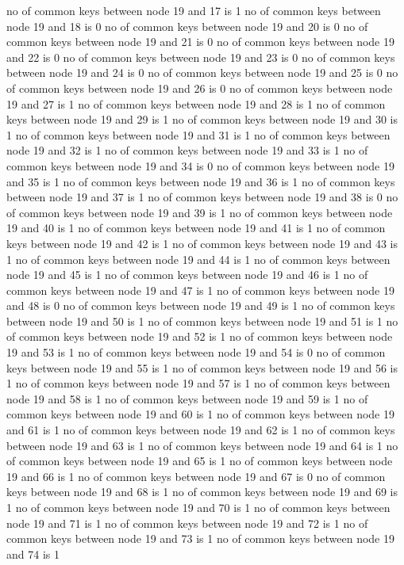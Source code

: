 no of common keys between node 19 and 17 is 1
no of common keys between node 19 and 18 is 0
no of common keys between node 19 and 20 is 0
no of common keys between node 19 and 21 is 0
no of common keys between node 19 and 22 is 0
no of common keys between node 19 and 23 is 0
no of common keys between node 19 and 24 is 0
no of common keys between node 19 and 25 is 0
no of common keys between node 19 and 26 is 0
no of common keys between node 19 and 27 is 1
no of common keys between node 19 and 28 is 1
no of common keys between node 19 and 29 is 1
no of common keys between node 19 and 30 is 1
no of common keys between node 19 and 31 is 1
no of common keys between node 19 and 32 is 1
no of common keys between node 19 and 33 is 1
no of common keys between node 19 and 34 is 0
no of common keys between node 19 and 35 is 1
no of common keys between node 19 and 36 is 1
no of common keys between node 19 and 37 is 1
no of common keys between node 19 and 38 is 0
no of common keys between node 19 and 39 is 1
no of common keys between node 19 and 40 is 1
no of common keys between node 19 and 41 is 1
no of common keys between node 19 and 42 is 1
no of common keys between node 19 and 43 is 1
no of common keys between node 19 and 44 is 1
no of common keys between node 19 and 45 is 1
no of common keys between node 19 and 46 is 1
no of common keys between node 19 and 47 is 1
no of common keys between node 19 and 48 is 0
no of common keys between node 19 and 49 is 1
no of common keys between node 19 and 50 is 1
no of common keys between node 19 and 51 is 1
no of common keys between node 19 and 52 is 1
no of common keys between node 19 and 53 is 1
no of common keys between node 19 and 54 is 0
no of common keys between node 19 and 55 is 1
no of common keys between node 19 and 56 is 1
no of common keys between node 19 and 57 is 1
no of common keys between node 19 and 58 is 1
no of common keys between node 19 and 59 is 1
no of common keys between node 19 and 60 is 1
no of common keys between node 19 and 61 is 1
no of common keys between node 19 and 62 is 1
no of common keys between node 19 and 63 is 1
no of common keys between node 19 and 64 is 1
no of common keys between node 19 and 65 is 1
no of common keys between node 19 and 66 is 1
no of common keys between node 19 and 67 is 0
no of common keys between node 19 and 68 is 1
no of common keys between node 19 and 69 is 1
no of common keys between node 19 and 70 is 1
no of common keys between node 19 and 71 is 1
no of common keys between node 19 and 72 is 1
no of common keys between node 19 and 73 is 1
no of common keys between node 19 and 74 is 1
